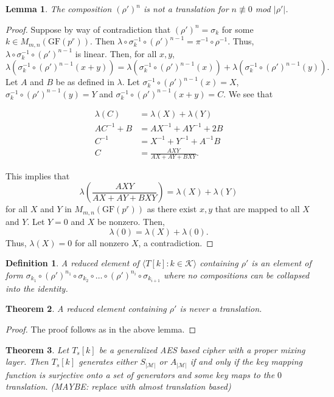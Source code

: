 \documentclass[11pt]{amsart}
\newcommand{\KK}{\mathcal{K}}
\newcommand{\MM}{\mathcal{M}}
\newcommand{\GF}{\mathrm{GF}}
\newtheorem{definition}{{\bf Definition}}
\newtheorem{theorem}{{\bf Theorem }}
\newtheorem{lemma}[theorem]{{\bf Lemma }}
\begin{document}
\begin{lemma}
The composition $(\rho')^n$ is not a translation for $n \not\equiv 0$ mod $|\rho'|$.
\end{lemma}
\begin{proof}
Suppose by way of contradiction that $(\rho')^n = \sigma_k$ for some $k \in M_{m,n}(\GF(p^r))$. Then $\lambda \circ \sigma^{-1}_k \circ (\rho')^{n-1} = \pi^{-1} \circ \rho^{-1}$. Thus, $\lambda \circ \sigma^{-1}_k \circ (\rho')^{n-1}$ is linear. Then, for all $x,y$, 
$$
\lambda(\sigma^{-1}_k \circ (\rho')^{n-1}(x+y)) = \lambda(\sigma^{-1}_k \circ (\rho')^{n-1}(x)) + \lambda(\sigma^{-1}_k \circ (\rho')^{n-1}(y)).
$$
Let $A$ and $B$ be as defined in $\lambda$. Let $\sigma^{-1}_k \circ (\rho')^{n-1}(x) = X$, $\sigma^{-1}_k \circ (\rho')^{n-1}(y) = Y$ and $\sigma^{-1}_k \circ (\rho')^{n-1}(x+y) = C$. We see that

\begin{align*}
\lambda(C) &= \lambda(X) + \lambda(Y) \\
AC^{-1} + B &= AX^{-1} + AY^{-1} + 2B \\
C^{-1} &= X^{-1} + Y^{-1} + A^{-1}B \\
C &= \frac{AXY}{AX + AY + BXY}.
\end{align*}

This implies that
$$
\lambda(\frac{AXY}{AX + AY + BXY}) = \lambda(X) + \lambda(Y)
$$
for all $X$ and $Y$ in $M_{m,n}(\GF(p^r))$ as there exist $x,y$ that are mapped to all $X$ and $Y$. Let $Y = 0$ and $X$ be nonzero. Then,
$$
\lambda(0) = \lambda(X) + \lambda(0).
$$
Thus, $\lambda(X) = 0$ for all nonzero $X$, a contradiction.
\end{proof}

\begin{definition}
A reduced element of $\langle T[k] : k \in \KK \rangle$ containing $\rho'$ is an element of form $\sigma_{k_1} \circ (\rho')^{n_1} \circ \sigma_{k_2} \circ \dots \circ (\rho')^{n_i} \circ \sigma_{k_{i+1}}$ where no compositions can be collapsed into the identity.
\end{definition}

\begin{theorem}
A reduced element containing $\rho'$ is never a translation.
\end{theorem}
\begin{proof}
The proof follows as in the above lemma.
\end{proof}

\begin{theorem}
Let $T_s[k]$ be a generalized AES based cipher with a proper mixing layer. Then $T_s[k]$ generates either $S_{|\MM|}$ or $A_{|\MM|}$ if and only if the key mapping function is surjective onto a set of generators and some key maps to the $0$ translation. (MAYBE: replace with almost translation based)
\end{theorem}
\end{document}
